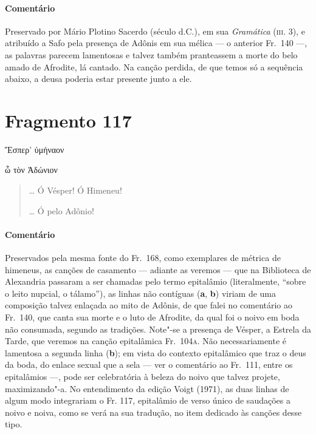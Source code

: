 {\paragraph{Comentário} Preservado por Mário Plotino Sacerdo (século  d.C.), em sua
\emph{Gramática} (\textsc{iii}. 3), e atribuído a Safo pela presença de Adônis em
sua mélica --- o anterior Fr.~140 ---, as palavras parecem lamentosas e
talvez também pranteassem a morte do belo amado de Afrodite, lá cantado. Na canção perdida, de que temos só a sequência abaixo, a deusa poderia estar presente junto a ele.}


\pagebreak
\section{Fragmento 117}

\begin{gkverse}
 Ἔσπερ’ ὐμήναον

\ast\quad\ast\quad\ast

ὦ τὸν Ἀδώνιον
\end{gkverse}

\begin{verse}
\ldots{} Ó Vésper! Ó Himeneu!

\ast\quad\ast\quad\ast

\ldots{} Ó pelo Adônio!
\end{verse}

{\paragraph{Comentário} Preservados pela mesma fonte do Fr.~168, como exemplares de métrica de
himeneus, as canções de casamento --- adiante as veremos --- que na
Biblioteca de Alexandria passaram a ser chamadas pelo termo epitalâmio
(literalmente, ``sobre o leito nupcial, o tálamo''), as linhas não contíguas (\textbf{a}, \textbf{b}) viriam de uma composição talvez enlaçada ao mito de Adônis, de que falei no
comentário ao Fr.~140, que canta sua morte e o luto de Afrodite, da qual foi o noivo em boda não consumada, segundo as tradições. Note"-se
a presença de Vésper, a Estrela da Tarde, que veremos na canção
epitalâmica Fr.~104\textsc{a}. Não necessariamente é lamentosa a segunda linha
(\textbf{b}); em vista do contexto epitalâmico que traz o deus da boda, do
enlace sexual que a sela --- ver o comentário ao Fr.~111, entre os
epitalâmios ---, pode ser celebratória à beleza do noivo que talvez projete, maximizando"-a. No entendimento da edição Voigt (1971), as duas linhas de algum modo integrariam o Fr. 117, epitalâmio de verso único de saudações a noivo e noiva, como se verá na sua tradução, no item dedicado às canções desse tipo.}




